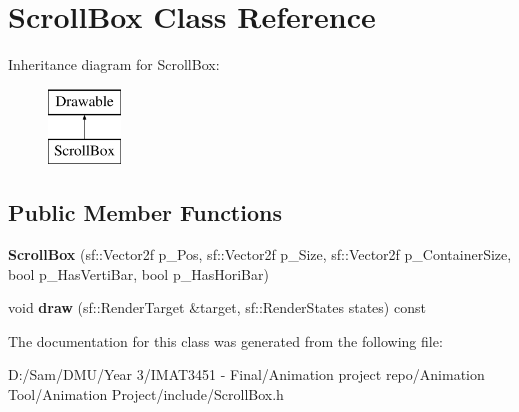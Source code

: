 \hypertarget{class_scroll_box}{}\section{Scroll\+Box Class Reference}
\label{class_scroll_box}
Inheritance diagram for Scroll\+Box\+:\begin{figure}[H]
\begin{center}
\leavevmode
\includegraphics[height=2.000000cm]{class_scroll_box}
\end{center}
\end{figure}
\subsection*{Public Member Functions}
\begin{DoxyCompactItemize}
\item 
\mbox{\label{class_scroll_box_a94c60fde856433108c6548f0892ef253}} 
{\bfseries Scroll\+Box} (sf\+::\+Vector2f p\+\_\+\+Pos, sf\+::\+Vector2f p\+\_\+\+Size, sf\+::\+Vector2f p\+\_\+\+Container\+Size, bool p\+\_\+\+Has\+Verti\+Bar, bool p\+\_\+\+Has\+Hori\+Bar)
\item 
\mbox{\label{class_scroll_box_a9e2d78a8b045d678e67bb026888a1012}} 
void {\bfseries draw} (sf\+::\+Render\+Target \&target, sf\+::\+Render\+States states) const
\end{DoxyCompactItemize}


The documentation for this class was generated from the following file\+:\begin{DoxyCompactItemize}
\item 
D\+:/\+Sam/\+D\+M\+U/\+Year 3/\+I\+M\+A\+T3451 -\/ Final/\+Animation project repo/\+Animation Tool/\+Animation Project/include/Scroll\+Box.\+h\end{DoxyCompactItemize}
